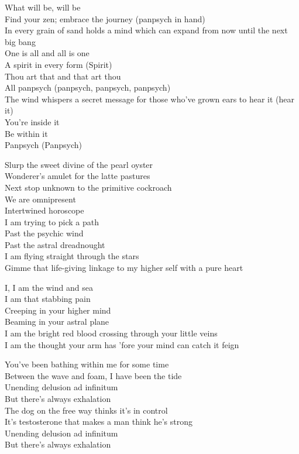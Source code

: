 What will be, will be\\
Find your zen; embrace the journey (panpsych in hand)\\
In every grain of sand holds a mind which can expand from now until the next big bang\\

One is all and all is one\\
A spirit in every form (Spirit)\\
Thou art that and that art thou\\
All panpsych (panpsych, panpsych, panpsych)\\
The wind whispers a secret message for those who've grown ears to hear it (hear it)\\
You're inside it\\
Be within it\\
Panpsych (Panpsych)\\


Slurp the sweet divine of the pearl oyster\\
Wonderer's amulet for the latte pastures\\
Next stop unknown to the primitive cockroach\\
We are omnipresent\\
Intertwined horoscope\\

I am trying to pick a path\\
Past the psychic wind\\
Past the astral dreadnought\\
I am flying straight through the stars\\
Gimme that life-giving linkage to my higher self with a pure heart\\


I, I am the wind and sea\\
I am that stabbing pain\\
Creeping in your higher mind\\
Beaming in your astral plane\\
I am the bright red blood crossing through your little veins\\
I am the thought your arm has 'fore your mind can catch it feign\\


You've been bathing within me for some time\\
Between the wave and foam, I have been the tide\\
Unending delusion ad infinitum\\
But there's always exhalation\\
The dog on the free way thinks it's in control\\
It's testosterone that makes a man think he's strong\\
Unending delusion ad infinitum\\
But there's always exhalation\\


